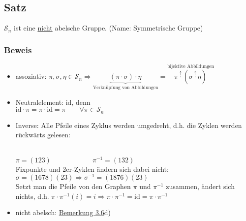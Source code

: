 \documentclass[12pt,titlepage, pdf]{article}
\newcommand{\uline}[1]{\underline{#1}}
\newcommand{\id}{\textrm{id}}
\renewcommand{\>}{\rightarrow}
\renewcommand{\*}{\cdot}
\begin{document}
	\subsection{Satz}
	\label{3.11}
	$\mathscr{S}_n$ ist eine \uline{nicht} abelsche Gruppe. (Name: Symmetrische Gruppe) \\
	\subsubsection*{Beweis}
	\begin{itemize}
		\item assoziativ: $\pi, \sigma, \eta \in \mathscr{S}_n \Rightarrow \underbrace{(\pi \cdot \sigma) \cdot \eta}_{\textrm{Verknüpfung von Abbildungen}} = \overset{\textrm{bijektive Abbildungen}}{\pi \overset{\uparrow}{\cdot} (\sigma \overset{\uparrow}{\cdot} \eta)}$
		\item Neutralelement: id, denn \\
		$\id \cdot \pi = \pi \cdot \id = \pi\qquad\forall\pi\in\mathscr{S}_n$
		\item Inverse: Alle Pfeile eines Zyklus werden umgedreht, d.h. die Zyklen werden rückwärts gelesen:\\
		\\
		$\pi=(123)\qquad\qquad\qquad\pi^{-1}=(132)$\\
		Fixpunkte und 2er-Zyklen ändern sich dabei nicht:\\
		$\sigma = (1678)(23)\Rightarrow\sigma^{-1} = (1876)(23)$\\
		Setzt man die Pfeile von den Graphen $\pi$ und $\pi^{-1}$ zusammen, ändert sich nichts, d.h. $\pi \cdot  \pi^{-1}(i) = i \Rightarrow \pi \cdot  \pi^{-1} = \id = \pi \cdot  \pi^{-1}$
		\item nicht abelsch: \hyperref[3.6]{Bemerkung 3.6}d)
	\end{itemize}\newpage
\end{document}

